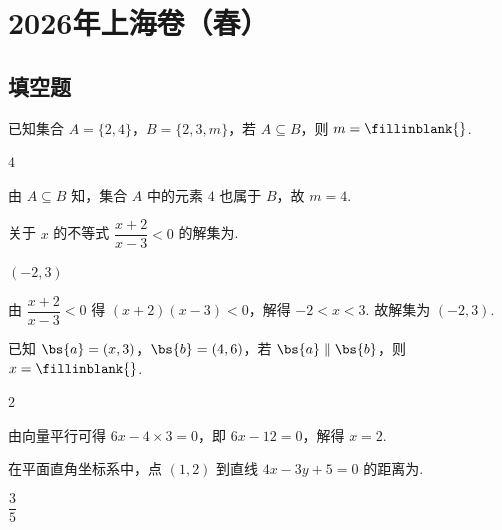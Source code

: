 \chapter{2026年上海卷（春）}

\section{填空题}

\begin{problem}
已知集合 \(A=\{2,4\}\)，\(B=\{2,3,m\}\)，若 \(A\subseteq B\)，则 \(m=\fillinblank{}\).
\end{problem}

\begin{answer}
\(4\)
\end{answer}

\begin{solution}
由 \(A\subseteq B\) 知，集合 \(A\) 中的元素 \(4\) 也属于 \(B\)，故 \(m=4\).
\end{solution}

\begin{problem}
关于 \(x\) 的不等式 \(\dfrac{x+2}{x-3}<0\) 的解集为\fillinblank{}.
\end{problem}

\begin{answer}
\((-2,3)\)
\end{answer}

\begin{solution}
由 \(\dfrac{x+2}{x-3}<0\) 得 \((x+2)(x-3)<0\)，解得 \(-2<x<3\). 故解集为 \((-2,3)\).
\end{solution}

\begin{problem}
已知 \(\bs{a}=(x,3)\)，\(\bs{b}=(4,6)\)，若 \(\bs{a}\parallel\bs{b}\)，则 \(x=\fillinblank{}\).
\end{problem}

\begin{answer}
\(2\)
\end{answer}

\begin{solution}
由向量平行可得 \(6x-4\times3=0\)，即 \(6x-12=0\)，解得 \(x=2\).
\end{solution}

\begin{problem}
在平面直角坐标系中，点 \((1,2)\) 到直线 \(4x-3y+5=0\) 的距离为\fillinblank{}.
\end{problem}

\begin{answer}
\(\dfrac35\)
\end{answer}

